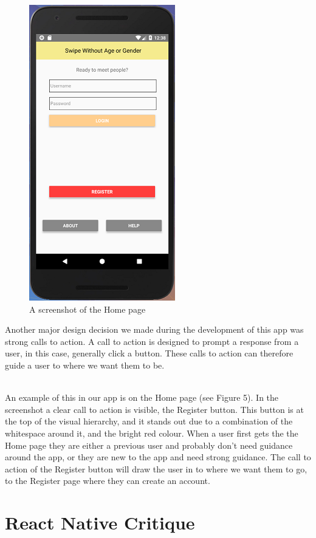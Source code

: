 \documentclass[a4paper, 11pt]{article}
\begin{document}
\begin{figure}
\centering
\includegraphics{home.png}
\caption{A screenshot of the Home page}
\end{figure}

Another major design decision we made during the development of this app was strong calls to action. A call to action is designed to prompt a response from a user, in this case, generally click a button. These calls to action can therefore guide a user to where we want them to be.

~\\
An example of this in our app is on the Home page (see Figure 5). In the screenshot a clear call to action is visible, the Register button. This button is at the top of the visual hierarchy, and it stands out due to a combination of the whitespace around it, and the bright red colour. When a user first gets the the Home page they are either a previous user and probably don't need guidance around the app, or they are new to the app and need strong guidance. The call to action of the Register button will draw the user in to where we want them to go, to the Register page where they can create an account.




\section{React Native Critique}
\end{document}
